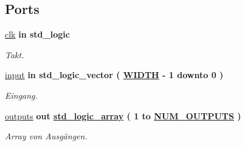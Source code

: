 \subsection*{Ports}
 \begin{DoxyCompactItemize}
\item 
\mbox{\label{classswitch_a4a4609c199d30b3adebbeb3a01276ec5}} 
\mbox{\hyperlink{classswitch_a4a4609c199d30b3adebbeb3a01276ec5}{clk}}  {\bfseries {\bfseries \textcolor{keywordflow}{in}\textcolor{vhdlchar}{ }}} {\bfseries \textcolor{comment}{std\+\_\+logic}\textcolor{vhdlchar}{ }} 
\begin{DoxyCompactList}\small\item\em Takt. \end{DoxyCompactList}\item 
\mbox{\label{classswitch_a2b3987f98197ec2f7358c2e5e91f234e}} 
\mbox{\hyperlink{classswitch_a2b3987f98197ec2f7358c2e5e91f234e}{input}}  {\bfseries {\bfseries \textcolor{keywordflow}{in}\textcolor{vhdlchar}{ }}} {\bfseries \textcolor{comment}{std\+\_\+logic\+\_\+vector}\textcolor{vhdlchar}{ }\textcolor{vhdlchar}{(}\textcolor{vhdlchar}{ }\textcolor{vhdlchar}{ }\textcolor{vhdlchar}{ }\textcolor{vhdlchar}{ }{\bfseries \mbox{\hyperlink{classswitch_ac3d29a0b6e2054c99b41ad85df850fa1}{W\+I\+D\+TH}}} \textcolor{vhdlchar}{-\/}\textcolor{vhdlchar}{ } \textcolor{vhdldigit}{1} \textcolor{vhdlchar}{ }\textcolor{keywordflow}{downto}\textcolor{vhdlchar}{ }\textcolor{vhdlchar}{ } \textcolor{vhdldigit}{0} \textcolor{vhdlchar}{ }\textcolor{vhdlchar}{)}\textcolor{vhdlchar}{ }} 
\begin{DoxyCompactList}\small\item\em Eingang. \end{DoxyCompactList}\item 
\mbox{\label{classswitch_ad39843cd1c61c04cf486a1276f95c950}} 
\mbox{\hyperlink{classswitch_ad39843cd1c61c04cf486a1276f95c950}{outputs}}  {\bfseries {\bfseries \textcolor{keywordflow}{out}\textcolor{vhdlchar}{ }}} {\bfseries {\bfseries \mbox{\hyperlink{classswitch__constants_ab8800f6bfb13a05fb4b8f9cf70129f9a}{std\+\_\+logic\+\_\+array}}} \textcolor{vhdlchar}{ }\textcolor{vhdlchar}{(}\textcolor{vhdlchar}{ }\textcolor{vhdlchar}{ } \textcolor{vhdldigit}{1} \textcolor{vhdlchar}{ }\textcolor{keywordflow}{to}\textcolor{vhdlchar}{ }\textcolor{vhdlchar}{ }\textcolor{vhdlchar}{ }\textcolor{vhdlchar}{ }{\bfseries \mbox{\hyperlink{classswitch_a83fa8fb9d47549377f34e64e6cb10446}{N\+U\+M\+\_\+\+O\+U\+T\+P\+U\+TS}}} \textcolor{vhdlchar}{ }\textcolor{vhdlchar}{)}\textcolor{vhdlchar}{ }} 
\begin{DoxyCompactList}\small\item\em Array von Ausgängen. \end{DoxyCompactList}\end{DoxyCompactItemize}



